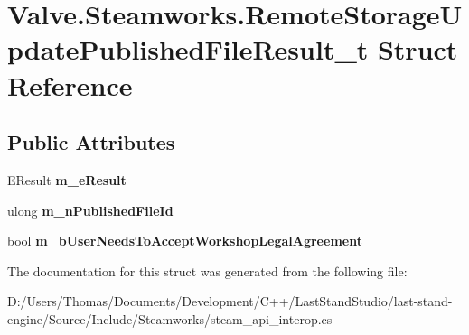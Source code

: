 \hypertarget{structValve_1_1Steamworks_1_1RemoteStorageUpdatePublishedFileResult__t}{}\section{Valve.\+Steamworks.\+Remote\+Storage\+Update\+Published\+File\+Result\+\_\+t Struct Reference}
\label{structValve_1_1Steamworks_1_1RemoteStorageUpdatePublishedFileResult__t}
\subsection*{Public Attributes}
\begin{DoxyCompactItemize}
\item 
\hypertarget{structValve_1_1Steamworks_1_1RemoteStorageUpdatePublishedFileResult__t_ab90e1ee3b755ed48c079e18f1a7f6c90}{}E\+Result {\bfseries m\+\_\+e\+Result}\label{structValve_1_1Steamworks_1_1RemoteStorageUpdatePublishedFileResult__t_ab90e1ee3b755ed48c079e18f1a7f6c90}

\item 
\hypertarget{structValve_1_1Steamworks_1_1RemoteStorageUpdatePublishedFileResult__t_abe65c11bc6634c3ea94447356e7679de}{}ulong {\bfseries m\+\_\+n\+Published\+File\+Id}\label{structValve_1_1Steamworks_1_1RemoteStorageUpdatePublishedFileResult__t_abe65c11bc6634c3ea94447356e7679de}

\item 
\hypertarget{structValve_1_1Steamworks_1_1RemoteStorageUpdatePublishedFileResult__t_a31737efd69f00928f41c823766b71fe5}{}bool {\bfseries m\+\_\+b\+User\+Needs\+To\+Accept\+Workshop\+Legal\+Agreement}\label{structValve_1_1Steamworks_1_1RemoteStorageUpdatePublishedFileResult__t_a31737efd69f00928f41c823766b71fe5}

\end{DoxyCompactItemize}


The documentation for this struct was generated from the following file\+:\begin{DoxyCompactItemize}
\item 
D\+:/\+Users/\+Thomas/\+Documents/\+Development/\+C++/\+Last\+Stand\+Studio/last-\/stand-\/engine/\+Source/\+Include/\+Steamworks/steam\+\_\+api\+\_\+interop.\+cs\end{DoxyCompactItemize}
